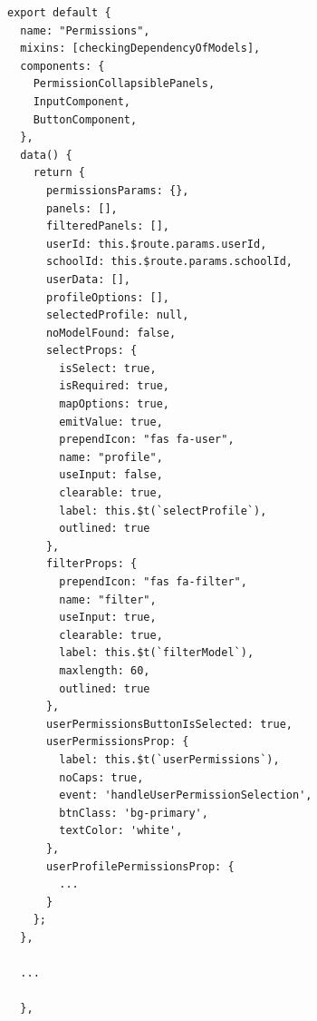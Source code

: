 \documentclass[a4paper, 12pt]{book}
\begin{document}
\begin{lstlisting}[caption=Implementazione di Permissions.vue]
export default {
  name: "Permissions",
  mixins: [checkingDependencyOfModels],
  components: {
    PermissionCollapsiblePanels,
    InputComponent,
    ButtonComponent,
  },
  data() {
    return {
      permissionsParams: {},
      panels: [],
      filteredPanels: [],
      userId: this.$route.params.userId,
      schoolId: this.$route.params.schoolId,
      userData: [],
      profileOptions: [],
      selectedProfile: null,
      noModelFound: false,
      selectProps: {
        isSelect: true,
        isRequired: true,
        mapOptions: true,
        emitValue: true,
        prependIcon: "fas fa-user",
        name: "profile",
        useInput: false,
        clearable: true,
        label: this.$t(`selectProfile`),
        outlined: true
      },
      filterProps: {
        prependIcon: "fas fa-filter",
        name: "filter",
        useInput: true,
        clearable: true,
        label: this.$t(`filterModel`),
        maxlength: 60,
        outlined: true
      },
      userPermissionsButtonIsSelected: true,
      userPermissionsProp: {
        label: this.$t(`userPermissions`),
        noCaps: true,
        event: 'handleUserPermissionSelection',
        btnClass: 'bg-primary',
        textColor: 'white',
      },
      userProfilePermissionsProp: {
        ...
      }
    };
  },

  ...

  },


\end{lstlisting}
\end{document}
